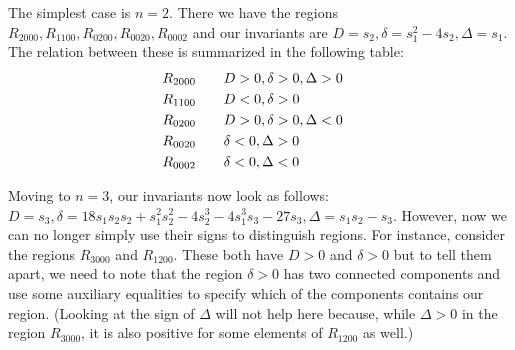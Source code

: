 \documentclass{amsart}
\theoremstyle{definition}
\theoremstyle{remark}
\numberwithin{equation}{section}
\begin{document}
The simplest case is $n=2$.  There we have the regions $R_{2000},
R_{1100}, R_{0200}, R_{0020}, R_{0002}$ and our invariants are $D =
s_2, \delta = s_1^2 - 4s_2, \Delta = s_1$.  The relation between these
is summarized in the following table:
\begin{align}
R_{2000} \qquad &D > 0, \delta > 0, \Delta > 0 \cr
R_{1100} \qquad &D < 0, \delta > 0 \cr
R_{0200} \qquad &D > 0, \delta > 0, \Delta < 0 \cr
R_{0020} \qquad &\delta < 0, \Delta > 0 \cr
R_{0002} \qquad &\delta < 0, \Delta < 0 \cr
\end{align}

Moving to $n=3$, our invariants now look as follows: $D = s_3, \delta
= 18 s_1 s_2 s_2 + s_1^2 s_2^2 - 4 s_2^3 - 4 s_1^3 s_3 - 27 s_3,
\Delta = s_1 s_2 - s_3$.  However, now we can no longer simply use their
signs to distinguish regions.  For instance, consider the regions
$R_{3000}$ and $R_{1200}$.  These both have $D > 0$ and $\delta > 0$
but to tell them apart, we need to note that the region $\delta > 0$
has two connected components and use some auxiliary equalities to
specify which of the components contains our region.  (Looking at the
sign of $\Delta$ will not help here because, while $\Delta > 0$ in the
region $R_{3000}$, it is also positive for some elements of $R_{1200}$
as well.)

% 




\end{document}
